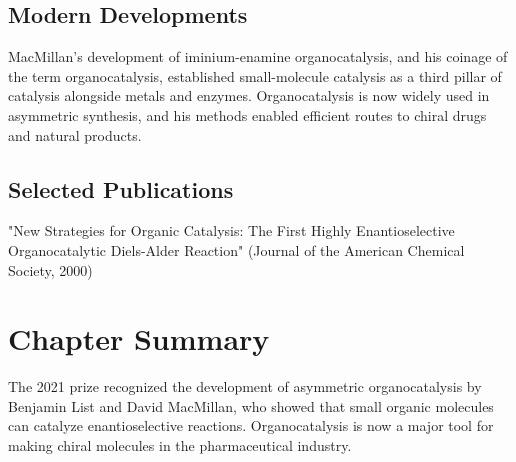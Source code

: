 \subsection*{Modern Developments}

MacMillan's development of iminium-enamine organocatalysis, and his coinage of the term organocatalysis, established small-molecule catalysis as a third pillar of catalysis alongside metals and enzymes. Organocatalysis is now widely used in asymmetric synthesis, and his methods enabled efficient routes to chiral drugs and natural products.

\subsection*{Selected Publications}

"New Strategies for Organic Catalysis: The First Highly Enantioselective Organocatalytic Diels-Alder Reaction" (Journal of the American Chemical Society, 2000)

\clearpage

\section*{Chapter Summary}

The 2021 prize recognized the development of asymmetric organocatalysis by Benjamin List and David MacMillan, who showed that small organic molecules can catalyze enantioselective reactions. Organocatalysis is now a major tool for making chiral molecules in the pharmaceutical industry.
